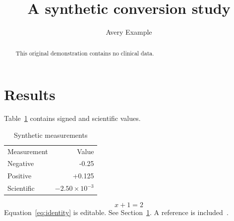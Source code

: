 \documentclass{article}
\title{A synthetic conversion study}
\author{Avery Example}
\date{}
\begin{document}
\maketitle
\begin{abstract}
This original demonstration contains no clinical data.
\end{abstract}

\section{Results}\label{sec:results}
Table~\ref{tab:values} contains signed and scientific values.
\begin{table}
\caption{Synthetic measurements}\label{tab:values}
\begin{tabular}{lr}
Measurement & Value \\
Negative & -0.25 \\
Positive & +0.125 \\
Scientific & $-2.50\times 10^{-3}$ \\
\end{tabular}
\end{table}
\begin{equation}\label{eq:identity}
x + 1 = 2
\end{equation}
Equation~\eqref{eq:identity} is editable. See Section~\ref{sec:results}.
A reference is included~\cite{example2026}.

\end{document}
